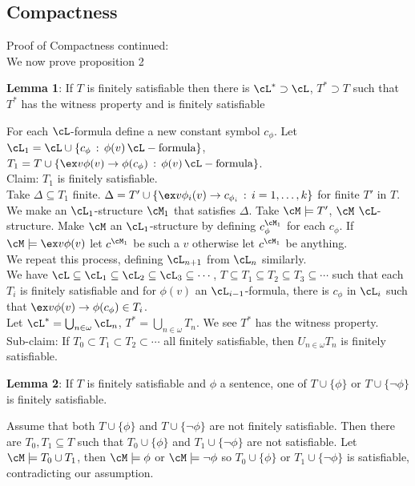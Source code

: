 
\subsection{Compactness} 

Proof of Compactness continued: \\
We now prove proposition 2

\noindent 
\textbf{Lemma 1}: If $T$ is finitely satisfiable then there is $\cL^* \supset \cL$, $T^* \supset T$ such that $T^*$ has the witness property and is finitely satisfiable

\begin{pf}
    For each $\cL$-formula define a new constant symbol $c_{\phi}$. Let $\cL_1 = \cL \cup \{c_{\phi} \, : \, \phi(v) \, \cL-\text{formula} \}$, $T_1 = T \cup \{\ex v \phi(v) \to \phi(c_{\phi}) \, : \, \phi(v) \, \cL-\text{formula} \}$. \\
    Claim: $T_1$ is finitely satisfiable. \\
    Take $\Delta \subseteq T_1$ finite. $\Delta = T' \cup \{\ex v \phi_i(v) \to c_{\phi_i} \, : \, i = 1, \ldots, k\}$ for finite $T'$ in $T$. We make an $\cL_1$-structure $\cM_1$ that satisfies $\Delta$. Take $\cM \models T'$, $\cM$ $\cL$-structure. Make $\cM$ an $\cL_1$-structure by defining $c^{\cM_1}_{\phi}$ for each $c_{\phi}$. If $\cM \models \ex v \phi(v)$ let $c^{\cM_1}$ be such a $v$ otherwise let $c^{\cM_1}$ be anything. \\
    We repeat this process, defining $\cL_{n+1}$ from $\cL_{n}$ similarly. \\
    We have $\cL \subseteq \cL_1 \subseteq \cL_2 \subseteq \cL_3 \subseteq \cdots$, $T \subseteq T_1 \subseteq T_2 \subseteq T_3 \subseteq \cdots$ such that each $T_i$ is finitely satisfiable and for $\phi(v)$ an $\cL_{i-1}$-formula, there is $c_{\phi}$ in $\cL_i$ such that $\ex v \phi(v) \to \phi(c_{\phi}) \in T_i$. \\
    Let $\cL^* = \bigcup_{n \in \omega} \cL_n$, $T^* = \bigcup_{n \in \omega} T_n$. We see $T^*$ has the witness property. \\
    Sub-claim: If $T_0 \subset T_1 \subset T_2 \subset \cdots$ all finitely satisfiable, then $U_{n \in \omega}T_n$ is finitely satisfiable. 
\end{pf}

\noindent
\textbf{Lemma 2}: If $T$ is finitely satisfiable and $\phi$ a sentence, one of $T \cup \{\phi \}$ or $T \cup \{\neg \phi\}$ is finitely satisfiable. 

\begin{pf}
    Assume that both $T \cup \{\phi\}$ and $T \cup \{ \neg \phi \}$ are not finitely satisfiable. Then there are $T_0, T_1 \subseteq T$ such that $T_0 \cup \{ \phi\}$ and $T_1 \cup \{\neg \phi\}$ are not satisfiable. Let $\cM \models T_0 \cup T_1$, then $\cM \models \phi$ or $\cM \models \neg \phi$ so $T_0 \cup \{\phi\}$ or $T_1 \cup \{\neg \phi\}$ is satisfiable, contradicting our assumption. 
\end{pf}

